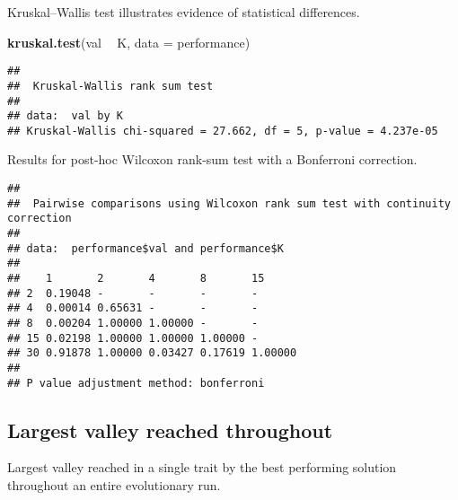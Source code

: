 \documentclass[]{book}
\newenvironment{Shaded}{\begin{snugshade}}{\end{snugshade}}
\newcommand{\DataTypeTok}[1]{\textcolor[rgb]{0.13,0.29,0.53}{#1}}
\newcommand{\KeywordTok}[1]{\textcolor[rgb]{0.13,0.29,0.53}{\textbf{#1}}}
\newcommand{\NormalTok}[1]{#1}
\newcommand{\OperatorTok}[1]{\textcolor[rgb]{0.81,0.36,0.00}{\textbf{#1}}}
\newcommand{\OtherTok}[1]{\textcolor[rgb]{0.56,0.35,0.01}{#1}}
\newcommand{\StringTok}[1]{\textcolor[rgb]{0.31,0.60,0.02}{#1}}
\begin{document}
Kruskal--Wallis test illustrates evidence of statistical differences.

\begin{Shaded}
\begin{Highlighting}[]
\KeywordTok{kruskal.test}\NormalTok{(val }\OperatorTok{~}\StringTok{ }\NormalTok{K, }\DataTypeTok{data =}\NormalTok{ performance)}
\end{Highlighting}
\end{Shaded}

\begin{verbatim}
## 
##  Kruskal-Wallis rank sum test
## 
## data:  val by K
## Kruskal-Wallis chi-squared = 27.662, df = 5, p-value = 4.237e-05
\end{verbatim}

Results for post-hoc Wilcoxon rank-sum test with a Bonferroni correction.

\begin{Shaded}
\end{Shaded}

\begin{verbatim}
## 
##  Pairwise comparisons using Wilcoxon rank sum test with continuity correction 
## 
## data:  performance$val and performance$K 
## 
##    1       2       4       8       15     
## 2  0.19048 -       -       -       -      
## 4  0.00014 0.65631 -       -       -      
## 8  0.00204 1.00000 1.00000 -       -      
## 15 0.02198 1.00000 1.00000 1.00000 -      
## 30 0.91878 1.00000 0.03427 0.17619 1.00000
## 
## P value adjustment method: bonferroni
\end{verbatim}

\hypertarget{largest-valley-reached-throughout-20}{%
\subsection{Largest valley reached throughout}\label{largest-valley-reached-throughout-20}}

Largest valley reached in a single trait by the best performing solution throughout an entire evolutionary run.
\end{document}
